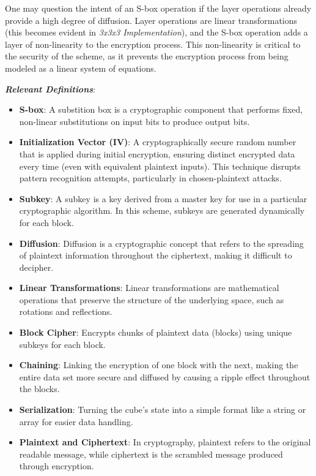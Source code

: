 \documentclass[12pt]{article}
\begin{document}
One may question the intent of an S-box operation if the layer operations already provide a high degree of diffusion. Layer operations are linear transformations (this becomes evident in \textit{3x3x3 Implementation}), and the S-box operation adds a layer of non-linearity to the encryption process. This non-linearity is critical to the security of the scheme, as it prevents the encryption process from being modeled as a linear system of equations. 

\vspace{0.5cm}

\textbf{\textit{Relevant Definitions}}:

\begin{itemize}
    \item \textbf{S-box}: A substition box is a cryptographic component that performs fixed, non-linear substitutions on input bits to produce output bits.
    \item \textbf{Initialization Vector (IV)}: A cryptographically secure random number that is applied during initial encryption, ensuring distinct encrypted data every time (even with equivalent plaintext inputs). This technique disrupts pattern recognition attempts, particularly in chosen-plaintext attacks.
    \item \textbf{Subkey}: A subkey is a key derived from a master key for use in a particular cryptographic algorithm. In this scheme, subkeys are generated dynamically for each block.
    \item \textbf{Diffusion}: Diffusion is a cryptographic concept that refers to the spreading of plaintext information throughout the ciphertext, making it difficult to decipher.
    \item \textbf{Linear Transformations}: Linear transformations are mathematical operations that preserve the structure of the underlying space, such as rotations and reflections.
    \item \textbf{Block Cipher}: Encrypts chunks of plaintext data (blocks) using unique subkeys for each block.
    \item \textbf{Chaining}: Linking the encryption of one block with the next, making the entire data set more secure and diffused by causing a ripple effect throughout the blocks.
    \item \textbf{Serialization}: Turning the cube's state into a simple format like a string or array for easier data handling.
    \item \textbf{Plaintext and Ciphertext}: In cryptography, plaintext refers to the original readable message, while ciphertext is the scrambled message produced through encryption.

\end{itemize}
\end{document}
